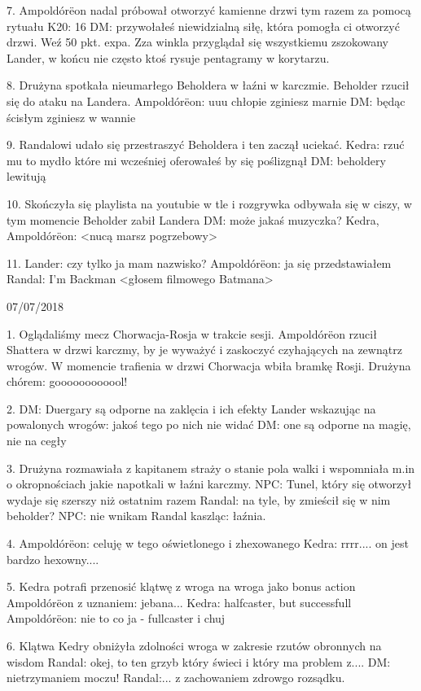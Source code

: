 \documentclass[10pt,twoside,twocolumn]{book}
\begin{document}
7. Ampoldórëon nadal próbował otworzyć kamienne drzwi tym razem za pomocą rytuału
K20: 16
DM: przywołałeś niewidzialną siłę, która pomogła ci otworzyć drzwi. Weź 50 pkt. expa.
Zza winkla przyglądał się wszystkiemu zszokowany Lander, w końcu nie często ktoś rysuje pentagramy w korytarzu.

8. Drużyna spotkała nieumarłego Beholdera w łaźni w karczmie. Beholder rzucił się do ataku na Landera.
Ampoldórëon: uuu chłopie zginiesz marnie
DM: będąc ścisłym zginiesz w wannie

9.  Randalowi udało się przestraszyć Beholdera i ten zaczął uciekać.
Kedra: rzuć mu to mydło które mi wcześniej oferowałeś by się poślizgnął
DM: beholdery lewitują

10. Skończyła się playlista na youtubie w tle i rozgrywka odbywała się w ciszy, w tym momencie Beholder zabił Landera
DM: może jakaś muzyczka?
Kedra, Ampoldórëon: <nucą marsz pogrzebowy>

11. Lander: czy tylko ja mam nazwisko?
Ampoldórëon: ja się przedstawiałem
Randal: I'm Backman <głosem filmowego Batmana>

07/07/2018

1. Oglądaliśmy mecz Chorwacja-Rosja w trakcie sesji. Ampoldórëon rzucił Shattera w drzwi karczmy, by je wyważyć i zaskoczyć czyhających na zewnątrz wrogów. W momencie trafienia  w drzwi Chorwacja wbiła bramkę Rosji.
Drużyna chórem: goooooooooool!

2. DM: Duergary są odporne na zaklęcia i ich efekty
Lander wskazując na powalonych wrogów: jakoś tego po nich nie widać
DM: one są odporne na magię, nie na cegły

3. Drużyna rozmawiała z kapitanem straży o stanie pola walki i wspomniała m.in o okropnościach jakie napotkali w łaźni karczmy.
NPC: Tunel, który się otworzył wydaje się szerszy niż ostatnim razem
Randal: na tyle, by zmieścił się w nim beholder?
NPC: nie wnikam
Randal kaszląc: łaźnia.

4. Ampoldórëon: celuję w tego oświetlonego i zhexowanego
Kedra: rrrr.... on jest bardzo hexowny....

5. Kedra potrafi przenosić klątwę z wroga na wroga jako bonus action
Ampoldórëon z uznaniem: jebana...
Kedra: halfcaster, but successfull
Ampoldórëon: nie to co ja - fullcaster i chuj

6. Klątwa Kedry obniżyła zdolności wroga w zakresie rzutów obronnych na wisdom
Randal: okej, to ten grzyb który świeci i który ma problem z....
DM: nietrzymaniem moczu!
Randal:... z zachowaniem zdrowgo rozsądku.
\end{document}
